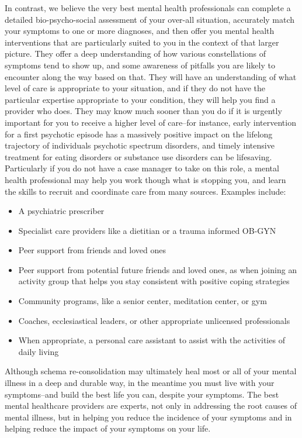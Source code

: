 \documentclass[12pt,letterpaper]{book}
\begin{document}
In contrast, we believe the very best mental health professionals can complete a detailed bio-psycho-social assessment of your over-all situation, accurately match your symptoms to one or more diagnoses, and then offer you mental health interventions that are particularly suited to you in the context of that larger picture. They offer a deep understanding of how various constellations of symptoms tend to show up, and some awareness of pitfalls you are likely to encounter along the way based on that. They will have an understanding of what level of care is appropriate to your situation, and if they do not have the particular expertise appropriate to your condition, they will help you find a provider who does. They may know much sooner than you do if it is urgently important for you to receive a higher level of care–for instance, early intervention for a first psychotic episode has a massively positive impact on the lifelong trajectory of individuals psychotic spectrum disorders, and timely intensive treatment for eating disorders or substance use disorders can be lifesaving. Particularly if you do not have a case manager to take on this role, a mental health professional may help you work though what is stopping you, and learn the skills to recruit and coordinate care from many sources. Examples include:
\begin{itemize}
    \item A psychiatric prescriber 
    \item Specialist care providers like a dietitian or a trauma informed OB-GYN
    \item Peer support from friends and loved ones
    \item Peer support from potential future friends and loved ones, as when joining an activity group that helps you stay consistent with positive coping strategies
    \item Community programs, like a senior center, meditation center, or gym
    \item Coaches, ecclesiastical leaders, or other appropriate unlicensed professionals
    \item When appropriate, a personal care assistant to assist with the activities of daily living
\end{itemize}
Although schema re-consolidation may ultimately heal most or all of your mental illness in a deep and durable way, in the meantime you must live with your symptoms–and build the best life you can, despite your symptoms. The best mental healthcare providers are experts, not only in addressing the root causes of mental illness, but in helping you reduce the incidence of your symptoms and in helping reduce the impact of your symptoms on your life. 
\end{document}
